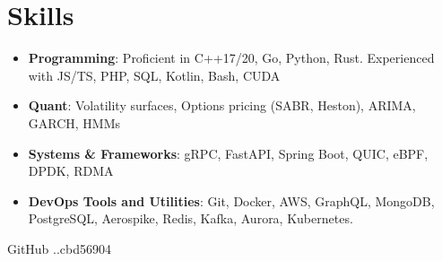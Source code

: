 \documentclass[letterpaper,11pt]{article}
\newcommand{\resumeSubHeadingListStart}{\begin{itemize}[leftmargin=*]}
\newcommand{\resumeSubHeadingListEnd}{\end{itemize}}
\begin{document}
\section{Skills}
    \resumeSubHeadingListStart
        \item{\textbf{Programming}: Proficient in C++17/20, Go, Python, Rust. Experienced with JS/TS, PHP, SQL, Kotlin, Bash, CUDA}
        \item{\textbf{Quant}: Volatility surfaces, Options pricing (SABR, Heston), ARIMA, GARCH, HMMs}
        \item{\textbf{Systems \& Frameworks}: gRPC, FastAPI, Spring Boot, QUIC, eBPF, DPDK, RDMA }
        \item{\textbf{DevOps Tools and Utilities}: Git, Docker, AWS, GraphQL, MongoDB, PostgreSQL, Aerospike, Redis, Kafka, Aurora, Kubernetes.}
    \resumeSubHeadingListEnd

\vspace{16pt}
\smallskip
\begin{footnotesize}
    GitHub \the\month.\the\year.cbd56904
\end{footnotesize}


\end{document}

